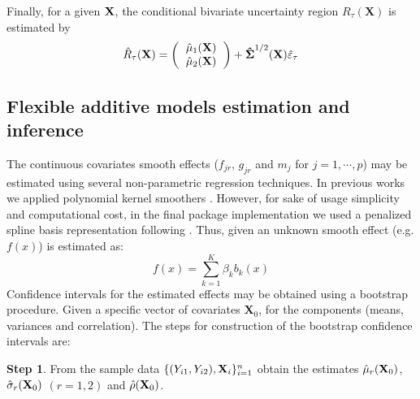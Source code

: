 Finally,  for a given $\bf X$, the conditional bivariate uncertainty region ${R}_{\tau}(\textbf{X})$ is estimated by 
\begin{equation}
\hat{R}_{\tau}(\textbf{X}) = 
\left({
	\begin{tabular} {c}
	$\hat{\mu}_1(\textbf{X})$ \\
	$\hat{\mu}_2(\textbf{X})$\
	\end{tabular}
}\right)
+ 
\boldsymbol{ \hat \Sigma}^{1/2}(\textbf{X}) \hat{\varepsilon}_{\tau}
\label{step5}
\end{equation} 
\subsection{Flexible additive models estimation and inference}

The continuous covariates smooth effects ($f_{jr}$,  $g_{jr}$ and $m_j$  for $j = 1,\cdots,p$) may be estimated using several non-parametric regression techniques. In previous works we applied polynomial kernel smoothers \citep{roca2020nonparametric}. However, for sake of usage simplicity and computational cost, in the final package implementation we used a penalized spline basis representation following \citep{wood2017generalized}. Thus, given an unknown smooth effect (e.g. $f(x)$) is estimated as:
$$f(x) = \sum_{k = 1}^{K} \beta_k b_k (x) $$
Confidence intervals for the estimated effects may be obtained using a bootstrap procedure. Given a specific vector of covariates $\textbf{X}_0$, for the components (means, variances and correlation). The steps for construction of the bootstrap confidence intervals are:


\noindent
\textbf{Step 1}. From the sample data $\{(Y_{i1},Y_{i2}),{\bf X}_i\}_{i=1}^n$ obtain the estimates  $\hat{\mu}_r({\bf X}_0)$, $\hat{\sigma}_{r}({\bf X}_0)$ $(r=1,2)$ and $\hat{\rho}({\bf X}_0)$.


